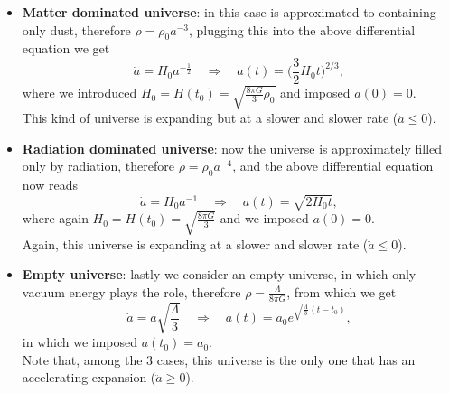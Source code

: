 \begin{itemize}
    \item \textbf{Matter dominated universe}: in this case  is approximated to containing only dust, therefore $\rho=\rho_0a^{-3}$, plugging this into the above differential equation we get$$\dot a=H_0a^{-\frac{1}{2}}\quad \Rightarrow\quad a(t)=\bigg(\frac{3}{2}H_0t\bigg)^{2/3},$$ where we introduced $H_0=H(t_0)=\sqrt{\frac{8\pi G}{3}\rho_0}$ and imposed $a(0)=0$.\\ This kind of universe is expanding but at a slower and slower rate ($\ddot a\leq0$).
    \item  \textbf{Radiation dominated universe}: now the universe is approximately filled only by radiation, therefore $\rho=\rho_0a^{-4}$, and the above differential equation now reads$$\dot a=H_0a^{-1}\quad \Rightarrow\quad a(t)=\sqrt{2H_0t},$$ where again $H_0=H(t_0)=\sqrt{\frac{8\pi G}{3}}$ and we imposed $a(0)=0$.\\ Again, this universe is expanding at a slower and slower rate ($\ddot a\leq0$).
    \item \textbf{Empty universe}: lastly we consider an empty universe, in which only vacuum energy plays the role, therefore $\rho=\frac{\Lambda}{8\pi G}$, from which we get$$\dot a=a\sqrt{\frac{\Lambda}{3}}\quad \Rightarrow\quad a(t)=a_0e^{\sqrt{\frac{\Lambda}{3}}(t-t_0)},$$
     in which we imposed $a(t_0)=a_0$.\\Note that, among the 3 cases, this universe is the only one that has an accelerating expansion ($\ddot a\geq0$). 
\end{itemize} 